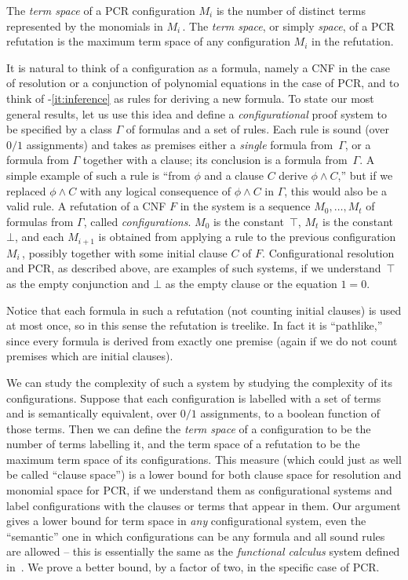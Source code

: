 \begin{definition}
The \emph{term space} of a PCR configuration $M_i$ is the number of distinct
terms represented by the monomials in $M_i$\,.
The \emph{term space}, or simply \emph{space}, of a PCR refutation is the maximum
term space of any configuration $M_i$ in the refutation.
\end{definition}


It is natural to think of a configuration as a formula, namely
a CNF in the case of resolution or a conjunction of polynomial equations in the case of PCR,
and to think of -\ref{it:inference} as rules for deriving a new formula.
To state our most general results, let us use this idea and define a \emph{configurational} proof system
to be specified by a class $\Gamma$ of formulas and a set of rules.
Each rule is sound (over $0/1$ assignments) and takes as premises
either a \emph{single} formula from~$\Gamma$, or a formula from $\Gamma$ together with a clause;
its conclusion is a formula from~$\Gamma$.
A simple example of such a rule is
``from $\phi$ and a clause $C$ derive $\phi \wedge C$,''
but if we replaced $\phi \wedge C$ with any logical consequence
of $\phi \wedge C$ in $\Gamma$, this would also be 
a valid rule.
 A refutation of a CNF $F$ 
in the system
is a sequence $M_0, \dots, M_t$ of formulas from $\Gamma$, called \emph{configurations}.
$M_0$ is the constant~$\top$, $M_t$ is the constant~$\bot$, and each $M_{i+1}$ is obtained
from applying a rule to the previous configuration~$M_i$\,, possibly together with some initial clause $C$ of $F$.
Configurational resolution and PCR,
as described above, are examples of such systems, if we understand~$\top$ as the empty conjunction and $\bot$
as the empty clause or the equation $1=0$. 

Notice that each formula in such a  refutation (not counting initial
clauses) is used at most once, so in this sense the refutation
 is treelike. In fact it is ``pathlike,''
since every formula is derived from exactly one premise (again if we do not count premises which are initial clauses).



We can study the complexity of such a system by studying the complexity of
its configurations. Suppose that each configuration is  labelled with a set of terms 
and is semantically equivalent, over $0/1$ assignments,  to a boolean function of those terms. 
Then we can define the \emph{term space} of a configuration to be the 
number of terms labelling it, %
%
and the term space of a refutation to be the maximum term space of its configurations.
This measure (which could just as well be called ``clause space'')  %
%
%
%
%
%
is a lower bound for %
both clause space for resolution and monomial space for PCR, if we understand them
as configurational systems and label configurations with the clauses or terms that
appear in them.
Our argument gives a lower bound for term space in \emph{any} configurational system,
even the ``semantic'' one in which configurations can be any formula and all sound rules are allowed
-- this is essentially the same as the \emph{functional calculus} system defined 
in~\cite{ABRW}. We prove a better bound, by a factor of two, in the specific case of PCR.


